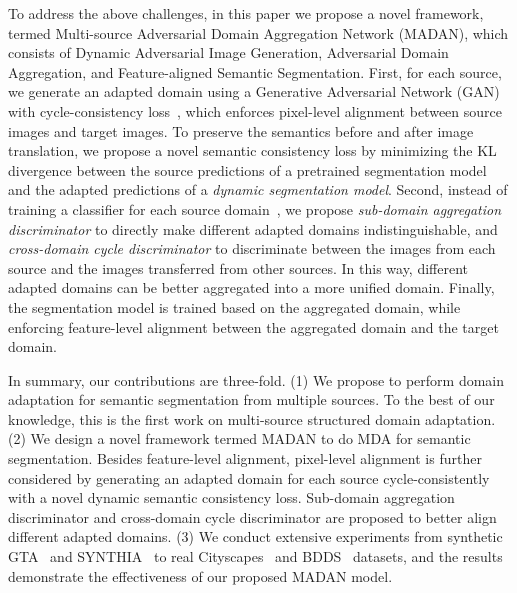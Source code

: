 \documentclass{article}
\begin{document}
To address the above challenges, in this paper we propose a novel framework, termed Multi-source Adversarial Domain Aggregation Network (MADAN), which consists of Dynamic Adversarial Image Generation, Adversarial Domain Aggregation, and Feature-aligned Semantic Segmentation. First, for each source, we generate an adapted domain using a Generative Adversarial Network (GAN)~\cite{goodfellow2014generative} with cycle-consistency loss~\cite{zhu2017unpaired}, which enforces pixel-level alignment between source images and target images. To preserve the semantics before and after image translation, we propose a novel semantic consistency loss by minimizing the KL divergence between the source predictions of a pretrained segmentation model and the adapted predictions of a \textit{dynamic segmentation model}. Second, instead of training a classifier for each source domain~\cite{xu2018deep,peng2018moment}, we propose \textit{sub-domain aggregation discriminator} to directly make different adapted domains indistinguishable, and \textit{cross-domain cycle discriminator} to discriminate between the images from each source and the images transferred from other sources. In this way, different adapted domains can be better aggregated into a more unified domain.
Finally, the segmentation model is trained based on the aggregated domain, while enforcing feature-level alignment between the aggregated domain and the target domain.

In summary, our contributions are three-fold. (1) We propose to perform domain adaptation for semantic segmentation from multiple sources. To the best of our knowledge, this is the first work on multi-source structured domain adaptation. (2) We design a novel framework termed MADAN to do MDA for semantic segmentation. Besides feature-level alignment, pixel-level alignment is further considered by generating an adapted domain for each source cycle-consistently with a novel dynamic semantic consistency loss. Sub-domain aggregation discriminator and cross-domain cycle discriminator are proposed to better align different adapted domains. (3) We conduct extensive experiments from synthetic GTA~\cite{richter2016playing} and SYNTHIA~\cite{ros2016synthia} to real Cityscapes~\cite{cordts2016cityscapes} and BDDS~\cite{yu2018bdd100k} datasets, and the results demonstrate the effectiveness of our proposed MADAN model.
\end{document}
